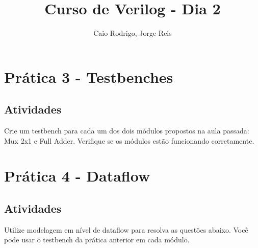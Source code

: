 \documentclass[a4paper]{article}
\title{Curso de Verilog - Dia 2}
\author{Caio Rodrigo, Jorge Reis}
\date{} %
\begin{document}
\maketitle

\section*{Prática 3 - Testbenches}

\subsection*{Atividades}
Crie um testbench para cada um dos dois módulos propostos na aula passada: Mux 2x1 e Full Adder. Verifique se os módulos estão funcionando corretamente.

\section*{Prática 4 - Dataflow}

\subsection*{Atividades}
Utilize modelagem em nível de dataflow para resolva as questões abaixo. Você pode usar o testbench da prática anterior em cada módulo.
\end{document}

